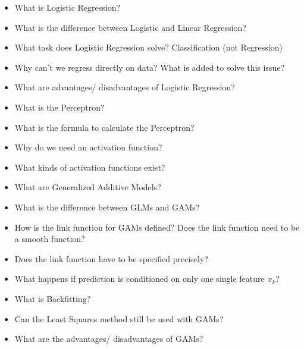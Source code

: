 \documentclass{report}
\begin{document}
\begin{itemize}
	\item What is Logistic Regression?
	\newline 
	\item What is the difference between Logistic and Linear Regression?
	\newline 
	\item What task does Logistic Regression solve?
	\newline Classification (not Regression)
	\item Why can't we regress directly on data? What is added to solve this issue?
	\newline 
	\item What are advantages/ disadvantages of Logistic Regression?
	\newline 
	\item What is the Perceptron?
	\newline 
	\item What is the formula to calculate the Perceptron?
	\newline 
	\item Why do we need an activation function?
	\newline 
	\item What kinds of activation functions exist?
	\newline 
	
	\item What are Generalized Additive Models?
	\newline 
	\item What is the difference between GLMs and GAMs?
	\newline 
	\item How is the link function for GAMs defined? Does the link function need to be a smooth function?
	\newline 
	\item Does the link function have to be specified precisely?
	\newline 
	\item What happens if prediction is conditioned on only one single feature $x_k$?
	\newline 
	\item What is Backfitting?
	\newline 
	\item Can the Least Squares method still be used with GAMs?
	\newline 
	\item What are the advantages/ disadvantages of GAMs?
	\newline 
	
	\end{itemize}
\end{document}
